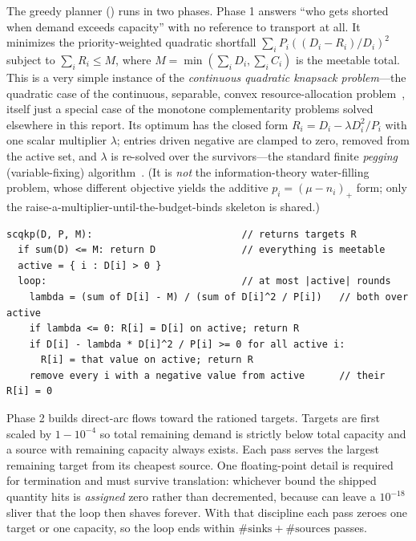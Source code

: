 The greedy planner () runs in two phases.
Phase 1 answers ``who gets shorted when demand exceeds capacity'' with no
reference to transport at all. It minimizes the priority-weighted
quadratic shortfall $\sum_i P_i \left((D_i - R_i)/D_i\right)^2$ subject
to $\sum_i R_i \le M$, where $M = \min(\sum_i D_i, \sum_i C_i)$ is the
meetable total. This is a very simple instance of the \emph{continuous
quadratic knapsack problem}---the quadratic case of the continuous, separable,
convex resource-allocation problem~\cite{patriksson2008,patrikssonStromberg2015},
itself just a special case of the monotone complementarity problems solved
elsewhere in this report. Its optimum has the closed form
$R_i = D_i - \lambda D_i^2 / P_i$ with one scalar multiplier $\lambda$;
entries driven negative are clamped to zero, removed from the active set,
and $\lambda$ is re-solved over the survivors---the standard finite
\emph{pegging} (variable-fixing) algorithm~\cite{frangioniGorgone2013}. (It is
\emph{not} the information-theory water-filling problem, whose different
objective yields the additive $p_i=(\mu-n_i)_+$ form; only the
raise-a-multiplier-until-the-budget-binds skeleton is shared.)

\begin{lstlisting}
scqkp(D, P, M):                          // returns targets R
  if sum(D) <= M: return D               // everything is meetable
  active = { i : D[i] > 0 }
  loop:                                  // at most |active| rounds
    lambda = (sum of D[i] - M) / (sum of D[i]^2 / P[i])   // both over active
    if lambda <= 0: R[i] = D[i] on active; return R
    if D[i] - lambda * D[i]^2 / P[i] >= 0 for all active i:
      R[i] = that value on active; return R
    remove every i with a negative value from active      // their R[i] = 0
\end{lstlisting}

Phase 2 builds direct-arc flows toward the rationed targets. Targets are
first scaled by $1 - 10^{-4}$ so total remaining demand is strictly below
total capacity and a source with remaining capacity always exists. Each
pass serves the largest remaining target from its cheapest source. One
floating-point detail is required for termination and must survive
translation: whichever bound the shipped quantity hits is \emph{assigned}
zero rather than decremented, because  can leave a
$10^{-18}$ sliver that the loop then shaves forever. With that discipline each pass zeroes
one target or one capacity, so the loop ends within
$\#\text{sinks} + \#\text{sources}$ passes.

